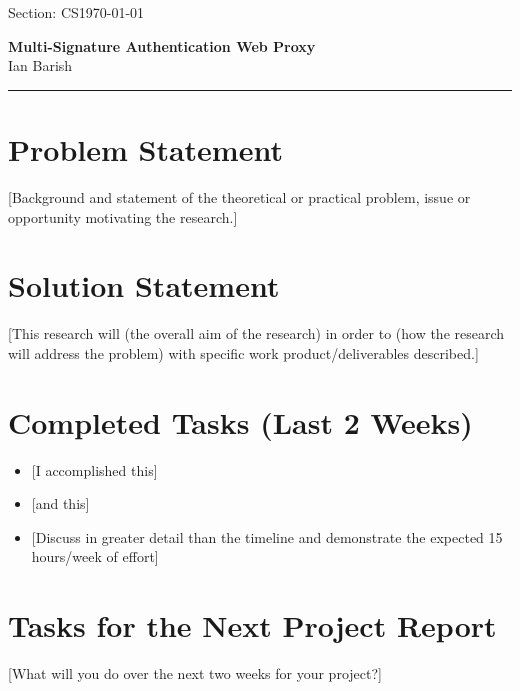 \documentclass[12pt]{article}
\newcommand{\Section}{CS}                        %
\newcommand{\ProjectTitle}{Multi-Signature Authentication Web Proxy}
\newcommand{\AuthorName}{Ian Barish}
\newcommand{\ReportDate}{\today}
\begin{document}
\noindent Section: \Section \hfill \ReportDate \\[0.2em]
\begin{center}
  {\large \textbf{\ProjectTitle}} \\[0.3em]
  \AuthorName
\end{center}

\noindent\rule{\linewidth}{0.4pt}

\section{Problem Statement}

[Background and statement of the theoretical or practical problem, issue or
opportunity motivating the research.]

\section{Solution Statement}

[This research will (the overall aim of the research) in order to (how the
research will address the problem) with specific work product/deliverables
described.]

\section{Completed Tasks (Last 2 Weeks)}

\begin{itemize}[leftmargin=1.5em, itemsep=2pt]
  \item {[I accomplished this]}
  \item {[and this]}
  \item {[Discuss in greater detail than the timeline and demonstrate the
        expected 15 hours/week of effort]}
\end{itemize}

\section{Tasks for the Next Project Report}

[What will you do over the next two weeks for your project?]
\end{document}
